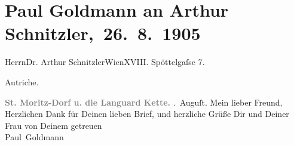 

         
         \renewcommand{\erwaehntePersonen}{Personen: Olga Schnitzler}
         \renewcommand{\erwaehnteOrte}{Orte: Edmund-Weiß-Gasse, Piz Languard, Sankt Moritz, Wien, Österreich-Ungarn}
         \renewcommand{\erwaehnteWerke}{}
               \section[ Paul Goldmann an Arthur Schnitzler, 26. 8. 1905]{ Paul Goldmann an Arthur Schnitzler, 26. 8. 1905}\nopagebreak{}\rehead{ }\begin{ledgroupsized}[t]{13cm}\normalsize\beginnumbering \toendnotes[C]{\smallbreak\pagebreak[2]} 
\toendnotes[C]{\smallbreak}\pstart{}{\pb}Herrn\pend{}\pstart{}Dr. Arthur Schnitzler\pend{}\pstart{}Wien\pend{}\pstart{}XVIII. Spöttelgaſse 7.\pend{}\pstart{}\begin{otherlanguage}{french}Autriche.\end{otherlanguage}\pend{}{\bigskip}\pstart
           \noindent{}\centering{}{\pb}\textcolor{gray}{\textbf{\textbf{St. Moritz-Dorf} u. die Languard Kette.}}\pend
           . Auguſt.\pend
           \pstart{}Mein lieber Freund,\pend\pstart
           Herzlichen Dank für Deinen lieben Brief, und herzliche Grüße Dir und Deiner Frau von Deinem getreuen {\\}\spacefill\mbox{Paul Goldmann}\pend
           
         
         \endnumbering{}\end{ledgroupsized}  \newcommand{\dateiname}{L03235}\newcommand{\titel}{Paul Goldmann an Arthur Schnitzler, 26. 8. 1905}\newcommand{\editorInnen}{Martin Anton Müller und Laura Untner}
      